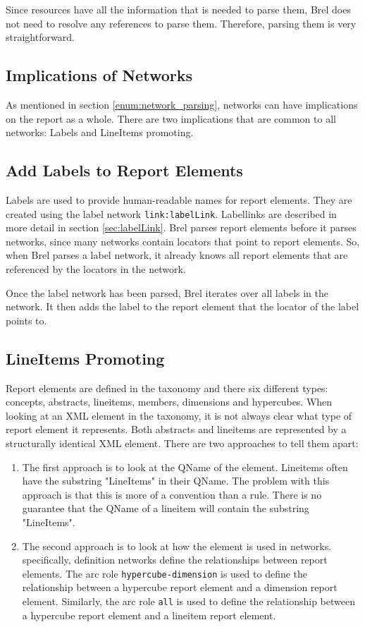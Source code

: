 Since resources have all the information that is needed to parse them, Brel does not need to resolve any references to parse them.
Therefore, parsing them is very straightforward.

\subsection{Implications of Networks}

As mentioned in section \ref{enum:network_parsing}, networks can have implications on the report as a whole.
There are two implications that are common to all networks: Labels and LineItems promoting.

\subsection{Add Labels to Report Elements}

Labels are used to provide human-readable names for report elements.
They are created using the label network \texttt{link:labelLink}.
Labellinks are described in more detail in section \ref{sec:labelLink}.
Brel parses report elements before it parses networks, since many networks contain locators that point to report elements.
So, when Brel parses a label network, it already knows all report elements that are referenced by the locators in the network.

Once the label network has been parsed, Brel iterates over all labels in the network.
It then adds the label to the report element that the locator of the label points to.

\subsection{LineItems Promoting}

Report elements are defined in the taxonomy and there six different types: concepts, abstracts, lineitems, members, dimensions and hypercubes.
When looking at an XML element in the taxonomy, it is not always clear what type of report element it represents.
Both abstracts and lineitems are represented by a structurally identical XML element.
There are two approaches to tell them apart: 

\begin{enumerate}
    \item The first approach is to look at the QName of the element.
    Lineitems often have the substring "LineItems" in their QName.
    The problem with this approach is that this is more of a convention than a rule.
    There is no guarantee that the QName of a lineitem will contain the substring "LineItems".
    \item The second approach is to look at how the element is used in networks.
    specifically, definition networks define the relationships between report elements.
    The arc role \texttt{hypercube-dimension} is used to define the relationship between a hypercube report element and a dimension report element.
    Similarly, the arc role \texttt{all} is used to define the relationship between a hypercube report element and a lineitem report element.
\end{enumerate}

